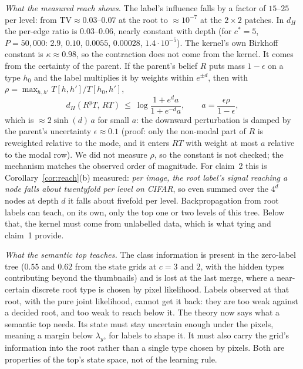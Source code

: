 \documentclass[11pt]{article}
\theoremstyle{definition}
\begin{document}
\emph{What the measured reach shows.} The label's influence falls by a factor of $15$--$25$ per level: from
$\mathrm{TV}\approx0.03$--$0.07$ at the root to $\approx10^{-7}$ at the $2\times2$ patches. In $d_H$ the per-edge ratio is
$0.03$--$0.06$, nearly constant with depth (for $c^*=5$, $P=50{,}000$: $2.9$, $0.10$, $0.0055$, $0.00028$, $1.4\cdot10^{-5}$). The
kernel's own Birkhoff constant is $\kappa\approx0.98$, so the contraction does not come from the kernel. It comes from
the certainty of the parent. If the parent's belief $R$ puts mass $1-\epsilon$ on a type $h_0$ and the label multiplies
it by weights within $e^{\pm d}$, then with $\rho=\max_{h,h'}T[h,h']/T[h_0,h']$,
\[
d_H(R^yT,\,RT)\ \le\ \log\frac{1+e^{d}a}{1+e^{-d}a},\qquad a=\frac{\epsilon\rho}{1-\epsilon},
\]
which is $\approx2\sinh(d)\,a$ for small $a$: the downward perturbation is damped by the parent's uncertainty
$\epsilon\approx0.1$ (proof: only the non-modal part of $R$ is reweighted relative to the mode, and it enters $RT$ with
weight at most $a$ relative to the modal row). We did not measure $\rho$, so the constant is not checked; the mechanism
matches the observed order of magnitude. For claim~2 this is Corollary~\ref{cor:reach}(b) measured: \emph{per image,
the root label's signal reaching a node falls about twentyfold per level on CIFAR}, so even summed over the $4^d$ nodes
at depth $d$ it falls about fivefold per level. Backpropagation from root labels can teach, on its own, only the top one
or two levels of this tree. Below that, the kernel must come from unlabelled data, which is what tying and claim~1
provide.

\emph{What the semantic top teaches.} The class information is present in the zero-label tree ($0.55$ and $0.62$ from
the state grids at $c=3$ and $2$, with the hidden types contributing beyond the thumbnails) and is lost at the last
merge, where a near-certain discrete root type is chosen by pixel likelihood. Labels observed at that root, with
the pure joint likelihood, cannot get it back: they are too weak against a decided root, and too weak to reach below
it. The theory now says what a semantic top needs. Its state must stay uncertain enough under the pixels, meaning a
margin below $\lambda_y$, for labels to shape it. It must also carry the grid's information into the root rather than
a single type chosen by pixels. Both are properties of the top's state space, not of the learning rule.
\end{document}
